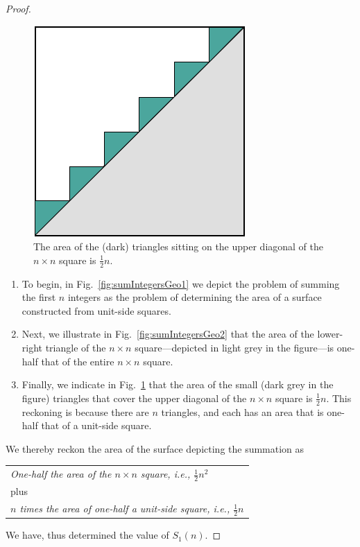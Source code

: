 \begin{proof}
\begin{figure}[h]
\begin{center}
       \includegraphics[scale=0.4]{FiguresMaths/SumIntegersGeometricFinal}
\caption{The area of the (dark) triangles sitting on the upper
  diagonal of the $n \times n$ square is $\frac{1}{2} n$.}
       \label{fig:sumIntegersGeo3}
\end{center}
\end{figure}
\begin{enumerate}
\item
To begin, in Fig.~\ref{fig:sumIntegersGeo1} we depict the problem of
summing the first $n$ integers as the problem of determining the area
of a surface constructed from unit-side squares.

\item
Next, we illustrate in Fig.~\ref{fig:sumIntegersGeo2} that the area of
the lower-right triangle of the $n \times n$ square---depicted in
light grey in the figure---is one-half that of the entire $n \times n$
square.

\item
Finally, we indicate in Fig.~\ref{fig:sumIntegersGeo3} that the area
of the small (dark grey in the figure) triangles that cover the upper
diagonal of the $n \times n$ square is $\frac{1}{2} n$.  This
reckoning is because there are $n$ triangles, and each has an area that
is one-half that of a unit-side square.
\end{enumerate}
We thereby reckon the area of the surface depicting the summation as

\begin{tabular}{l}
{\it One-half the area of the $n \times n$ square,
i.e., $\frac{1}{2} n^2$} \\
\hspace*{.15in} plus   \\
{\it $n$ times the area of one-half a unit-side square,
i.e., $\frac{1}{2} n$}
\end{tabular}

\noindent
We have, thus determined the value of $S_1(n)$.
\end{proof}

